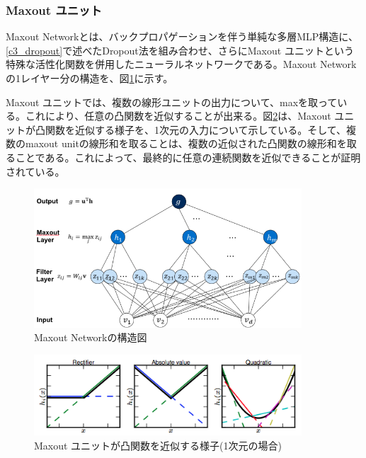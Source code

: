 \subsubsection{Maxout ユニット}
Maxout Networkとは、バックプロパゲーションを伴う単純な多層MLP構造に、\ref{c3_dropout}で述べたDropout法を組み合わせ、さらにMaxout ユニットという特殊な活性化関数を併用したニューラルネットワークである\cite{goodfellow2013maxout}。Maxout Networkの1レイヤー分の構造を、図\ref{c3_maxout_arch}に示す。\par
Maxout ユニットでは、複数の線形ユニットの出力について、maxを取っている。これにより、任意の凸関数を近似することが出来る。図\ref{c3_maxout_app}は、Maxout ユニットが凸関数を近似する様子を、1次元の入力について示している。そして、複数のmaxout unitの線形和を取ることは、複数の近似された凸関数の線形和を取ることである。これによって、最終的に任意の連続関数を近似できることが証明されている。
\begin{figure}[tbp]
 \begin{center}
  \includegraphics[width=100mm]{img/c3/maxout_arch}
 \end{center}
 \caption{Maxout Networkの構造図}
 \label{c3_maxout_arch}
\end{figure}
\begin{figure}[tbp]
 \begin{center}
  \includegraphics[width=100mm]{img/c3/maxout_app}
 \end{center}
 \caption{Maxout ユニットが凸関数を近似する様子(1次元の場合)}
 \label{c3_maxout_app}
\end{figure}

